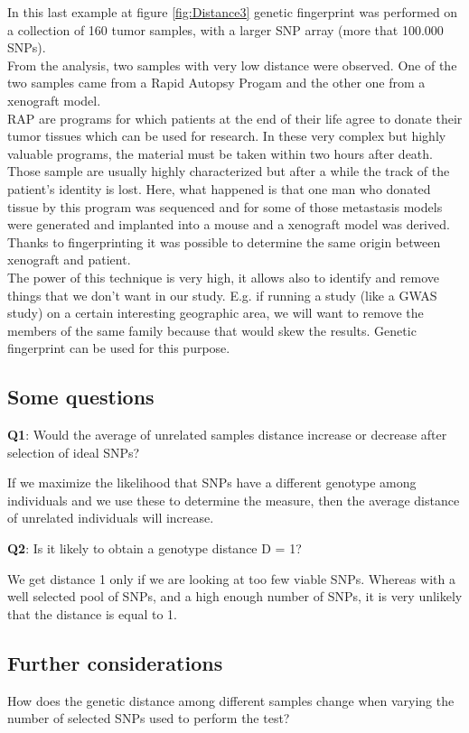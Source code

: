 In this last example at figure \ref{fig:Distance3} genetic fingerprint was performed on a collection of 160  tumor samples, with a larger SNP array (more that 100.000 SNPs).
\\
From the analysis, two samples with very low distance were observed. One of the two samples came from a Rapid Autopsy Progam and the other one from a xenograft model.
\\
RAP are programs for which patients at the end of their life agree to donate their tumor tissues which can be used for research. In these very complex but highly valuable programs, the material must be taken within two hours after death. Those sample are usually highly characterized but after a while the track of the patient's identity is lost.
Here, what happened is that one man who donated tissue by this program was sequenced and for some of those metastasis models were generated and implanted into a mouse and a xenograft model was derived. Thanks to fingerprinting it was possible to determine the same origin between xenograft and patient.
\\
The power of this technique is very high, it allows also to identify and remove things that we don't want in our study. E.g. if running a study (like a GWAS study) on a certain interesting geographic area, we will want to remove the members of the same family because that would skew the results. Genetic fingerprint can be used for this purpose.

\subsection{Some questions}

\textbf{Q1}: Would the average of unrelated samples distance increase or decrease after selection of ideal SNPs?

If we maximize the likelihood that SNPs have a different genotype among individuals and we use these to determine the measure, then the average distance of unrelated individuals will increase.

\textbf{Q2}: Is it likely to obtain a genotype distance D = 1?

We get distance 1 only if we are looking at too few viable SNPs. Whereas with a well selected pool of SNPs, and a high enough number of SNPs, it is very unlikely that the distance is equal to 1.

\subsection{Further considerations}
How does the genetic distance among different samples change when varying the number of selected SNPs used to perform the test?

